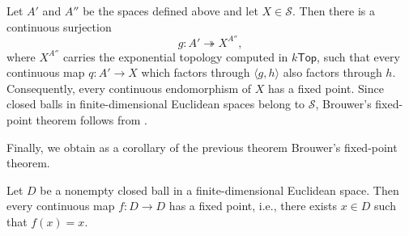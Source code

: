 \begin{fact}
    \label{thm:mccallum-brouwer}
    Let $A'$ and $A''$ be the spaces defined above and let $X\in\mathcal S$.
    Then there is a continuous surjection
    \[ g:A'\twoheadrightarrow X^{A''}, \]
    where $X^{A''}$ carries the exponential topology computed in $k\mathsf{Top}$, such that every continuous map $q:A'\to X$ which factors through $\langle g,h\rangle$ also factors through $h$.
    Consequently, every continuous endomorphism of $X$ has a fixed point.
    Since closed balls in finite-dimensional Euclidean spaces belong to $\mathcal S$, Brouwer's fixed-point theorem follows from .
\end{fact}

Finally, we obtain as a corollary of the previous theorem Brouwer's fixed-point theorem.

\begin{corollary}
    Let $D$ be a nonempty closed ball in a finite-dimensional Euclidean space.
    Then every continuous map $f:D\to D$ has a fixed point, i.e., there exists $x\in D$ such that $f(x)=x$.
\end{corollary}

